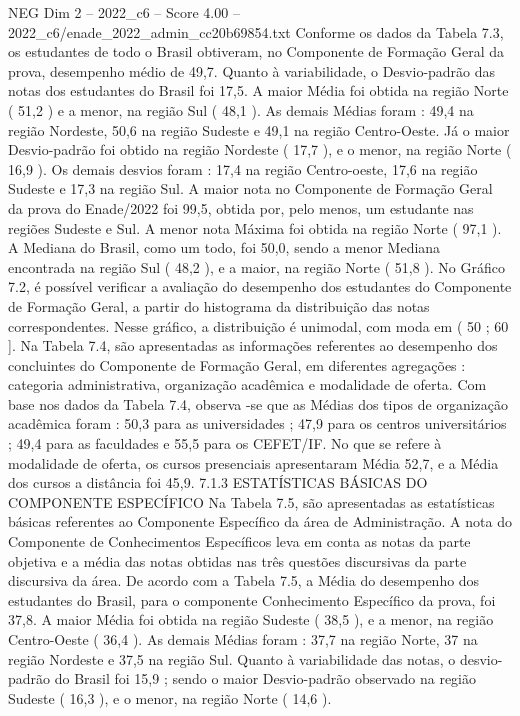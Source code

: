 \begin{textsample}{NEG Dim 2 – 2022\_c6 – Score 4.00 – 2022\_c6/enade\_2022\_admin\_cc20b69854.txt}
Conforme os dados da Tabela 7.3, os estudantes de todo o Brasil obtiveram, no Componente de Formação Geral da prova, desempenho médio de 49,7.
Quanto à variabilidade, o Desvio-padrão das notas dos estudantes do Brasil foi 17,5.
A maior Média foi obtida na região Norte ( 51,2 ) e a menor, na região Sul ( 48,1 ).
As demais Médias foram : 49,4 na região Nordeste, 50,6 na região Sudeste e 49,1 na região Centro-Oeste.
Já o maior Desvio-padrão foi obtido na região Nordeste ( 17,7 ), e o menor, na região Norte ( 16,9 ).
Os demais desvios foram : 17,4 na região Centro-oeste, 17,6 na região Sudeste e 17,3 na região Sul.
A maior nota no Componente de Formação Geral da prova do Enade/2022 foi 99,5, obtida por, pelo menos, um estudante nas regiões Sudeste e Sul.
A menor nota Máxima foi obtida na região Norte ( 97,1 ).
A Mediana do Brasil, como um todo, foi 50,0, sendo a menor Mediana encontrada na região Sul ( 48,2 ), e a maior, na região Norte ( 51,8 ).
No Gráfico 7.2, é possível verificar a avaliação do desempenho dos estudantes do Componente de Formação Geral, a partir do histograma da distribuição das notas correspondentes.
Nesse gráfico, a distribuição é unimodal, com moda em ( 50 ; 60 ].
Na Tabela 7.4, são apresentadas as informações referentes ao desempenho dos concluintes do Componente de Formação Geral, em diferentes agregações : categoria administrativa, organização acadêmica e modalidade de oferta.
Com base nos dados da Tabela 7.4, observa -se que as Médias dos tipos de organização acadêmica foram : 50,3 para as universidades ; 47,9 para os centros universitários ; 49,4 para as faculdades e 55,5 para os CEFET/IF.
No que se refere à modalidade de oferta, os cursos presenciais apresentaram Média 52,7, e a Média dos cursos a distância foi 45,9. 7.1.3 ESTATÍSTICAS BÁSICAS DO COMPONENTE ESPECÍFICO Na Tabela 7.5, são apresentadas as estatísticas básicas referentes ao Componente Específico da área de Administração.
A nota do Componente de Conhecimentos Específicos leva em conta as notas da parte objetiva e a média das notas obtidas nas três questões discursivas da parte discursiva da área.
De acordo com a Tabela 7.5, a Média do desempenho dos estudantes do Brasil, para o componente Conhecimento Específico da prova, foi 37,8.
A maior Média foi obtida na região Sudeste ( 38,5 ), e a menor, na região Centro-Oeste ( 36,4 ).
As demais Médias foram : 37,7 na região Norte, 37 na região Nordeste e 37,5 na região Sul.
Quanto à variabilidade das notas, o desvio-padrão do Brasil foi 15,9 ; sendo o maior Desvio-padrão observado na região Sudeste ( 16,3 ), e o menor, na região Norte ( 14,6 ).

\end{textsample}
